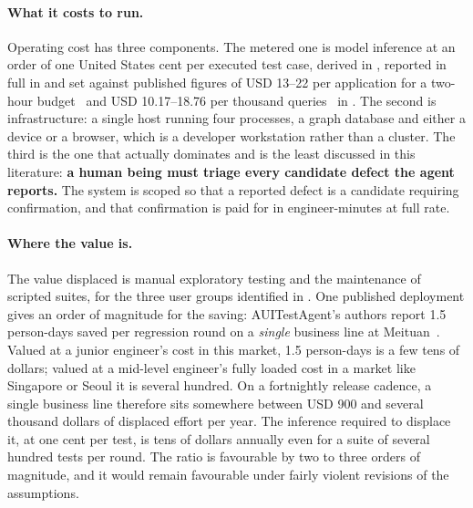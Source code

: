 \paragraph{What it costs to run.} Operating cost has three components. The
metered one is model inference at an order of one United States cent per
executed test case, derived in , reported in full in
 and
set against published figures of USD 13--22 per application for a two-hour
budget~\cite{droidagent} and USD 10.17--18.76 per thousand
queries~\cite{autodroid} in . The second is
infrastructure: a single host running four processes, a graph database and
either a device or a browser, which is a developer workstation rather than a
cluster. The third is the one that actually dominates and is the least
discussed in this literature: \textbf{a human being must triage every candidate
defect the agent reports.} The system is scoped so that a reported defect is a
candidate requiring confirmation, and that confirmation is paid for in
engineer-minutes at full rate.

\paragraph{Where the value is.} The value displaced is manual exploratory
testing and the maintenance of scripted suites, for the three user groups
identified in . One published deployment gives an order of
magnitude for the saving: AUITestAgent's authors report 1.5 person-days saved
per regression round on a \emph{single} business line at
Meituan~\cite{auitestagent}. Valued at a junior engineer's cost in this market,
1.5 person-days is a few tens of dollars; valued at a mid-level engineer's
fully loaded cost in a market like Singapore or Seoul it is several hundred.
On a fortnightly release cadence, a single business line therefore sits
somewhere between USD 900 and several thousand dollars of displaced effort per
year. The inference required to displace it, at one cent per test, is tens of
dollars annually even for a suite of several hundred tests per round. The ratio is
favourable by two to three orders of magnitude, and it would remain favourable
under fairly violent revisions of the assumptions.

